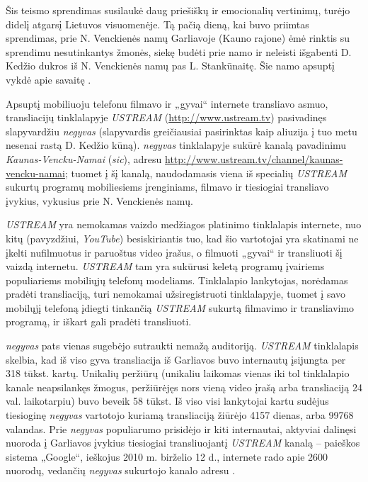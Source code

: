 \documentclass[kursinis-darbas]{vukf}
\begin{document}
Šis teismo sprendimas susilaukė daug priešiškų ir emocionalių vertinimų, turėjo didelį atgarsį Lietuvos visuomenėje. Tą pačią dieną, kai buvo priimtas sprendimas, prie N. Venckienės namų Garliavoje (Kauno rajone) ėmė rinktis su sprendimu nesutinkantys žmonės, siekę budėti prie namo ir neleisti išgabenti D. Kedžio dukros iš N. Venckienės namų pas L. Stankūnaitę. Šie namo apsuptį vykdė apie savaitę \cite{delfi_teismas_sustabde_sprendima_perduoti_kedzio_dukra_motinai_stankunaitei}.

Apsuptį mobiliuoju telefonu filmavo ir „gyvai“ internete transliavo asmuo, transliacijų tinklalapyje \emph{USTREAM} (\url{http://www.ustream.tv}) pasivadinęs slapyvardžiu \emph{negyvas} (slapyvardis greičiausiai pasirinktas kaip aliuzija į tuo metu nesenai rastą D. Kedžio kūną). \emph{negyvas} tinklalapyje sukūrė kanalą pavadinimu \emph{Kaunas-Vencku-Namai} (\emph{sic}), adresu \url{http://www.ustream.tv/channel/kaunas-vencku-namai}; tuomet į šį kanalą, naudodamasis viena iš specialių \emph{USTREAM} sukurtų programų mobiliesiems įrenginiams, filmavo ir tiesiogiai transliavo įvykius, vykusius prie N. Venckienės namų.

\emph{USTREAM} yra nemokamas vaizdo medžiagos platinimo tinklalapis internete, nuo kitų (pavyzdžiui, \emph{YouTube}) besiskiriantis tuo, kad šio vartotojai yra skatinami ne įkelti nufilmuotus ir paruoštus video įrašus, o filmuoti „gyvai“ ir transliuoti šį vaizdą internetu. \emph{USTREAM} tam yra sukūrusi keletą programų įvairiems populiariems mobiliųjų telefonų modeliams. Tinklalapio lankytojas, norėdamas pradėti transliaciją, turi nemokamai užsiregistruoti tinklalapyje, tuomet į savo mobilųjį telefoną įdiegti tinkančią \emph{USTREAM} sukurtą filmavimo ir transliavimo programą, ir iškart gali pradėti transliuoti.

\emph{negyvas} pats vienas sugebėjo sutraukti nemažą auditoriją. \emph{USTREAM} tinklalapis skelbia, kad iš viso gyva transliacija iš Garliavos buvo internautų įsijungta per 318 tūkst. kartų. Unikalių peržiūrų (unikaliu laikomas vienas iki tol tinklalapio kanale neapsilankęs žmogus, peržiūrėjęs nors vieną video įrašą arba transliaciją 24 val. laikotarpiu) buvo beveik 58 tūkst. Iš viso visi lankytojai kartu sudėjus tiesioginę \emph{negyvas} vartotojo kuriamą transliaciją žiūrėjo 4157 dienas, arba 99768 valandas. Prie \emph{negyvas} populiarumo prisidėjo ir kiti internautai, aktyviai dalinęsi nuoroda į Garliavos įvykius tiesiogiai transliuojantį \emph{USTREAM} kanalą – paieškos sistema „Google“, ieškojus 2010 m. birželio 12 d., internete rado apie 2600 nuorodų, vedančių \emph{negyvas} sukurtojo kanalo adresu \cite{google_search_negyvas_url}.
\end{document}
